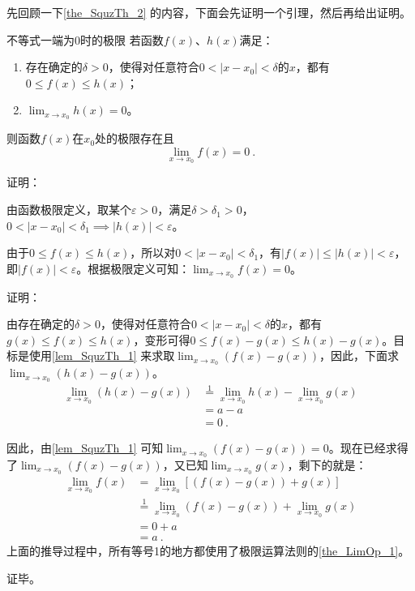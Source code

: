 先回顾一下\autoref{the_SquzTh_2} 的内容，下面会先证明一个引理，然后再给出证明。

\begin{lemma}{不等式一端为0时的极限}\label{lem_SquzTh_1}
若函数$f(x)$、$h(x)$满足：
\begin{enumerate}
\item 存在确定的$\delta>0$，使得对任意符合$0<|x-x_0|<\delta$的$x$，都有$0\leq f(x)\leq h(x)$；
\item $\lim _{x\to x_0}h(x)=0$。
\end{enumerate}
则函数$f(x)$在$x_0$处的极限存在且
\begin{equation}
\lim _{x\to x_0}f(x)=0~.
\end{equation}

证明：

由函数极限定义，取某个$\varepsilon>0$，满足$\delta>\delta_1>0$，$0<|x-x_0|<\delta_1\implies|h(x)|<\varepsilon$。

由于$0\leq f(x)\leq h(x)$，所以对$0<|x-x_0|<\delta_1$，有$|f(x)|\leq |h(x)|<\varepsilon$，即$|f(x)|<\varepsilon$。根据极限定义可知：$\lim _{x\to x_0}f(x)=0$。

\end{lemma}

证明：

由存在确定的$\delta>0$，使得对任意符合$0<|x-x_0|<\delta$的$x$，都有$g(x)\leq f(x)\leq h(x)$，变形可得$0\leq f(x)-g(x)\leq h(x)-g(x)$。目标是使用\autoref{lem_SquzTh_1} 来求取$\lim _{x\to x_0}(f(x)-g(x))$，因此，下面求$\lim _{x\to x_0}(h(x)-g(x))$。
$$
\begin{align*}
\lim _{x\to x_0}(h(x)-g(x))&\overset{\mathrm{1}}{=}\lim _{x\to x_0}h(x)-\lim _{x\to x_0}g(x)\\
&=a-a\\
&=0~.
\end{align*}
$$

因此，由\autoref{lem_SquzTh_1} 可知$\lim _{x\to x_0}(f(x)-g(x))=0$。现在已经求得了$\lim _{x\to x_0}(f(x)-g(x))$，又已知$\lim _{x\to x_0}g(x)$，剩下的就是：
$$
\begin{align*}
\lim _{x\to x_0}f(x) &= \lim _{x\to x_0}[(f(x)-g(x))+g(x)] \\ 
&\overset{\mathrm{1}}{=} \lim _{x\to x_0}(f(x)-g(x))+\lim _{x\to x_0}g(x)\\ 
&= 0+a\\ 
&=a~.\end{align*}
$$
上面的推导过程中，所有等号1的地方都使用了极限运算法则的\autoref{the_LimOp_1}。

证毕。
